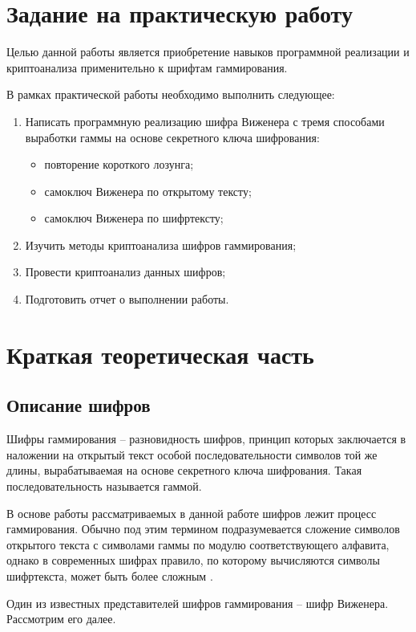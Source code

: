 \section{Задание на практическую работу}
Целью данной работы является приобретение навыков программной реализации и криптоанализа применительно к шрифтам гаммирования.

В рамках практической работы необходимо выполнить следующее:
\begin{enumerate}
    \item Написать программную реализацию шифра Виженера с тремя способами выработки гаммы на основе секретного ключа шифрования:
          \begin{itemize}
              \item повторение короткого лозунга;
              \item самоключ Виженера по открытому тексту;
              \item самоключ Виженера по шифртексту;
          \end{itemize}
    \item Изучить методы криптоанализа шифров гаммирования;
    \item Провести криптоанализ данных шифров;
    \item Подготовить отчет о выполнении работы.
\end{enumerate}
\newpage



\section{Краткая теоретическая часть}
\subsection{Описание шифров}
Шифры гаммирования – разновидность шифров, принцип которых заключается в наложении на открытый текст особой последовательности символов той же длины, вырабатываемая на основе секретного ключа шифрования. Такая последовательность называется гаммой. 

В основе работы рассматриваемых в данной работе шифров лежит процесс гаммирования. Обычно под этим термином подразумевается сложение символов открытого текста с символами гаммы по модулю соответствующего алфавита, однако в современных шифрах правило, по которому вычисляются символы шифртекста, может быть более сложным \cite{wiki:gamma}. 

Один из известных представителей шифров гаммирования – шифр Виженера. Рассмотрим его далее. 


